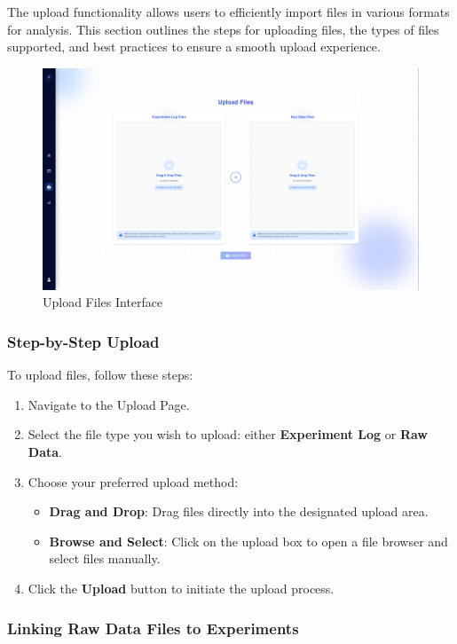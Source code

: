 \documentclass[12pt]{article}
\begin{document}
The upload functionality allows users to efficiently import files in various
formats for analysis. This section outlines the steps for uploading files, the
types of files supported, and best practices to ensure a smooth upload
experience.

\begin{figure}[H]
    \centering
    \includegraphics[width=1\textwidth]{./Diagrams/Upload.png}
    \caption{Upload Files Interface}
\end{figure}

\subsubsection{Step-by-Step Upload}
To upload files, follow these steps:
\begin{enumerate}
    \item Navigate to the Upload Page.
    \item Select the file type you wish to upload: either \textbf{Experiment
    Log} or \textbf{Raw Data}.
    \item Choose your preferred upload method:
    \begin{itemize}
        \item \textbf{Drag and Drop}: Drag files directly into the designated
        upload area.
        \item \textbf{Browse and Select}: Click on the upload box to open a file
        browser and select files manually.
    \end{itemize}
    \item Click the \textbf{Upload} button to initiate the upload process.
\end{enumerate}

\subsubsection{Linking Raw Data Files to Experiments}
\end{document}
